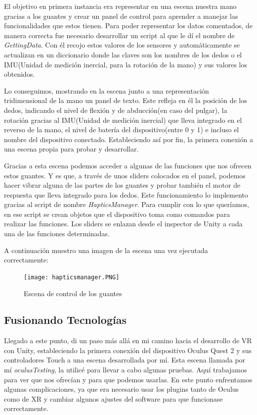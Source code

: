El objetivo en primera instancia era representar en una escena nuestra mano gracias a los guantes y crear un panel de control para aprender a manejar las funcionalidades que estos tienen. Para poder representar los datos comentados, de manera correcta fue necesario desarrollar un script al que le dí el nombre de \textit{GettingData}. Con él recojo estos valores de los sensores y automáticamente se actualizan en un diccionario donde las claves son los nombres de los dedos o el IMU(Unidad de medición inercial, para la rotación de la mano)  y sus valores los obtenidos.

Lo conseguimos, mostrando en la escena junto a una representación tridimensional de la mano un panel de texto. Este refleja en él la posición de los dedos, indicando el nivel de flexión y de abducción(en caso del pulgar), la rotación gracias al IMU(Unidad de medición inercial) que lleva integrado en el reverso de la mano, el nivel de batería del dispositivo(entre 0 y 1) e incluso el nombre del dispositivo conectado. Estableciendo así por fin, la primera conexión a una escena propia para probar y desarrollar.

Gracias a esta escena podemos acceder a algunas de las funciones que nos ofrecen estos guantes. Y es que, a través de unos sliders colocados en el panel, podemos hacer vibrar alguna de las partes de los guantes y probar también el motor de respuesta que lleva integrado para los dedos. Este funcionamiento lo implemento gracias al script de nombre \textit{HapticsManager}. Para cumplir con lo que queríamos, en ese script se crean objetos que el dispositivo toma como comandos para realizar las funciones. Los sliders se enlazan desde el inspector de Unity a cada una de las funciones determinadas.

A continuación muestro una imagen de la escena una vez ejecutada correctamente:
\begin{figure}[h]
\centering
\label{Escena de control de los guantes}
\texttt{[image: hapticsmanager.PNG]}
\caption{Escena de control de los guantes}
\end{figure}

\subsection{Fusionando Tecnologías}
Llegado a este punto, di un paso más allá en mi camino hacia el desarrollo de VR\cite{VR} con Unity, estableciendo la primera conexión del dispositivo Oculus Quest 2 y sus controladores Touch a una escena desarrollada por mí. Esta escena llamada por mí \textit{oculusTesting}, la utilicé para llevar a cabo algunas pruebas. Aquí trabajamos para ver que nos ofrecían y para que podemos usarlas. 
En este punto enfrentamos algunas complicaciones, ya que era necesario usar los plugins tanto de Oculus como de XR y cambiar algunos ajustes del software para que funcionase correctamente.

